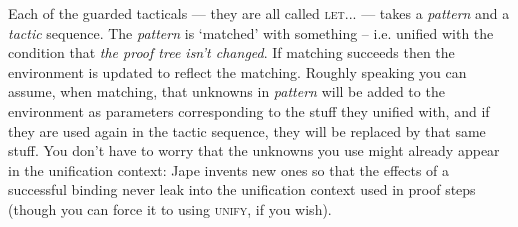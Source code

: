 Each of the guarded tacticals --- they are all called \textsc{let...} --- takes a \textit{pattern} and a \textit{tactic} sequence. The \textit{pattern} is `matched' with something -- i.e. unified with the condition that \emph{the proof tree isn't changed}. If matching succeeds then the environment is updated to reflect the matching. Roughly speaking you can assume, when matching, that unknowns in \textit{pattern} will be added to the environment as parameters corresponding to the stuff they unified with, and if they are used again in the tactic sequence, they will be replaced by that same stuff. You don't have to worry that the unknowns you use might already appear in the unification context: Jape invents new ones so that the effects of a successful binding never leak into the unification context used in proof steps (though you can force it to using \textsc{unify}, if you wish).

 